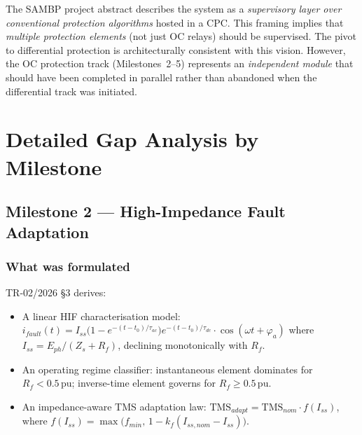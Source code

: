 \documentclass[12pt,a4paper]{article}
\newcommand{\pu}{\,\text{pu}}
\begin{document}
\begin{pivotbox}[title={SAMBP Abstract Implication}]
The SAMBP project abstract describes the system as a \emph{supervisory layer
over conventional protection algorithms} hosted in a CPC.  This framing implies
that \emph{multiple protection elements} (not just OC relays) should be
supervised.  The pivot to differential protection is architecturally consistent
with this vision.  However, the OC protection track (Milestones~2--5) represents
an \emph{independent module} that should have been completed in parallel rather
than abandoned when the differential track was initiated.
\end{pivotbox}


\section{Detailed Gap Analysis by Milestone}
\label{sec:gaps}

\subsection{Milestone 2 — High-Impedance Fault Adaptation}
\label{sec:gap:m2}

\subsubsection{What was formulated}

TR-02/2026 \S3 derives:
\begin{itemize}
  \item A linear HIF characterisation model:
        $i_{fault}(t) = I_{ss}\bigl(1 - e^{-(t-t_0)/\tau_{ac}}\bigr)
        e^{-(t-t_0)/\tau_{dc}} \cdot \cos(\omega t + \varphi_a)$
        where $I_{ss} = E_{ph} / (Z_s + R_f)$, declining monotonically with $R_f$.
  \item An operating regime classifier: instantaneous element dominates for
        $R_f < 0.5\pu$; inverse-time element governs for $R_f \geq 0.5\pu$.
  \item An impedance-aware TMS adaptation law:
        $\text{TMS}_{adapt} = \text{TMS}_{nom} \cdot f(I_{ss})$,
        where $f(I_{ss}) = \max\bigl(f_{min},\, 1 - k_f(I_{ss,nom} - I_{ss})\bigr)$.
\end{itemize}
\end{document}
